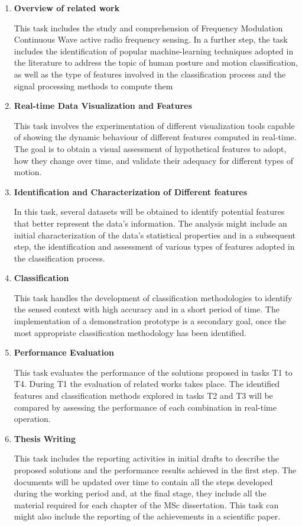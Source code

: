 \begin{enumerate}     

\item \textbf{Overview of related work}

This task includes the study and comprehension of Frequency Modulation Continuous Wave active radio frequency sensing. In a further step, the task includes the identification of popular machine-learning techniques adopted in the literature to address the topic of human posture and motion classification, as well as the type of features involved in the classification process and the signal processing methods to compute them

\item \textbf{Real-time Data Visualization and Features}

This task involves the experimentation of different visualization tools capable of showing the dynamic behaviour of different features computed in real-time. The goal is to obtain a visual assessment of hypothetical features to adopt, how they change over time, and validate their adequacy for different types of motion.

\item \textbf{Identification and Characterization of Different features}

In this task, several datasets will be obtained to identify potential features that better represent the data’s information. The analysis might include an initial characterization of the data’s statistical properties and in a subsequent step, the identification and assessment of various types of features adopted in the classification process.

\item \textbf{Classification}

This task handles the development of classification methodologies to identify the sensed context with high accuracy and in a short period of time. The implementation of a demonstration prototype is a secondary goal, once the most appropriate classification methodology has been identified. 

\item \textbf{Performance Evaluation}

This task evaluates the performance of the solutions proposed in tasks T1 to T4. During T1 the evaluation of related works takes place. The identified features and classification methods explored in tasks T2 and T3 will be compared by assessing the performance of each combination in real-time operation.

\item \textbf{Thesis Writing}

This task includes the reporting activities in initial drafts to describe the proposed solutions and the performance results achieved in the first step. The documents will be updated over time to contain all the steps developed during the working period and, at the final stage, they include all the material required for each chapter of the MSc dissertation. This task can might also include the reporting of the achievements in a scientific paper.  

\end{enumerate}


